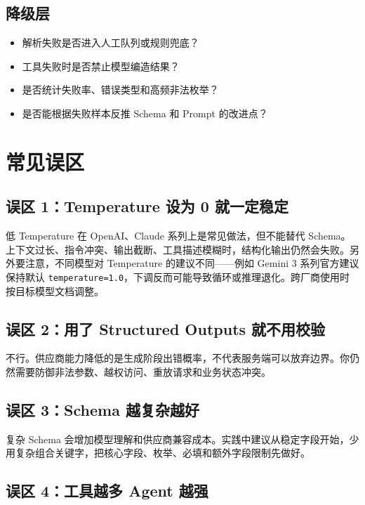 \documentclass[10pt,a4paper]{ctexart}
\begin{document}
\subsection{降级层}

\begin{itemize}[itemsep=2pt, topsep=4pt]
  \item 解析失败是否进入人工队列或规则兜底？
  \item 工具失败时是否禁止模型编造结果？
  \item 是否统计失败率、错误类型和高频非法枚举？
  \item 是否能根据失败样本反推 Schema 和 Prompt 的改进点？
\end{itemize}


\section{常见误区}


\subsection{误区 1：Temperature 设为 0 就一定稳定}


低 Temperature 在 OpenAI、Claude 系列上是常见做法，但不能替代 Schema。上下文过长、指令冲突、输出截断、工具描述模糊时，结构化输出仍然会失败。另外要注意，不同模型对 Temperature 的建议不同——例如 Gemini 3 系列官方建议保持默认 \texttt{temperature=1.0}，下调反而可能导致循环或推理退化。跨厂商使用时按目标模型文档调整。



\subsection{误区 2：用了 Structured Outputs 就不用校验}


不行。供应商能力降低的是生成阶段出错概率，不代表服务端可以放弃边界。你仍然需要防御非法参数、越权访问、重放请求和业务状态冲突。



\subsection{误区 3：Schema 越复杂越好}


复杂 Schema 会增加模型理解和供应商兼容成本。实践中建议从稳定字段开始，少用复杂组合关键字，把核心字段、枚举、必填和额外字段限制先做好。



\subsection{误区 4：工具越多 Agent 越强}
\end{document}
